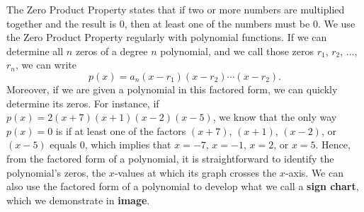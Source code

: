 \documentclass{ximera}
\begin{document}
The Zero Product Property states that if two or more numbers are multiplied together and the result is $0$, then at least one of the numbers must be $0$.  We use the Zero Product Property regularly with polynomial functions.  If we can determine all $n$ zeros of a degree $n$ polynomial, and we call those zeros $r_1$, $r_2$, $\ldots$, $r_n$, we can write%
\[
p(x) = a_n(x-r_1)(x-r_2) \cdots (x-r_2)\text{.}
\]
Moreover, if we are given a polynomial in this factored form, we can quickly determine its zeros.  For instance, if $p(x) = 2(x+7)(x+1)(x-2)(x-5)$, we know that the only way $p(x) = 0$ is if at least one of the factors $(x+7)$, $(x+1)$, $(x-2)$, or $(x-5)$ equals $0$, which implies that $x = -7$, $x = -1$, $x = 2$, or $x = 5$.  Hence, from the factored form of a polynomial, it is straightforward to identify the polynomial's zeros, the $x$-values at which its graph crosses the $x$-axis.  We can also use the factored form of a polynomial to develop what we call a \textbf{sign chart}, which we demonstrate in \textbf{image}. %
\end{document}
